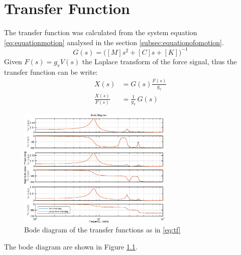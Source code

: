 \chapter{Transfer Function}
\label{chap:tf}
The transfer function was calculated from the system equation
\eqref{eq:equationmotion} analysed in the section
\ref{subsec:equationofomotion}.
%
\begin{equation}
\label{eq:gs}
	G(s) = \big([M]s^2+[C]s+[K]\big)^{-1}
\end{equation}
%
Given \(F(s) = g_{\text{v}}V(s)\)  the Laplace transform of the force signal,
thus the transfer function can be write:
\begin{align}
\label{eq:tf}
  {X(s)} &= G(s)\frac{F(s)}{g_{\text{v}}}\\
  \frac{X(s)}{F(s)} &= \frac{1}{g_{\text{v}}}\,{G(s)}
\end{align}
%
\begin{figure}[htb]
	\centering
	\includegraphics[width=0.66\textwidth]{bodediagram1}
	\caption{Bode diagram of the transfer functions as in \eqref{eq:tf}}
	\label{fig:bodeplot1}
\end{figure}
%
The bode diagram are shown in Figure \ref{fig:bodeplot1}.